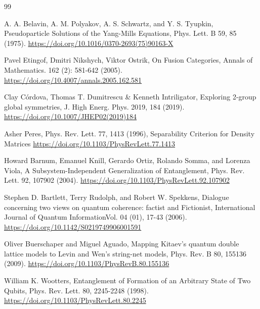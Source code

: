 \documentclass[12pt,a4paper]{article}
\begin{document}
\begin{thebibliography}{99}
	
	A. A. Belavin, A. M. Polyakov, A. S. Schwartz, and Y. S. Tyupkin,
	Pseudoparticle Solutions of the Yang-Mills Equations,
	Phys. Lett. B 59, 85 (1975).
	\url{https://doi.org/10.1016/0370-2693(75)90163-X}
	
	
	Pavel Etingof, Dmitri Nikshych, Viktor Ostrik,
	On Fusion Categories,
	Annals of Mathematics. 162 (2): 581-642 (2005).
	\url{https://doi.org/10.4007/annals.2005.162.581}
	
	
	Clay Córdova, Thomas T. Dumitrescu \& Kenneth Intriligator,
	Exploring 2-group global symmetries,
	J. High Energ. Phys. 2019, 184 (2019).
	\url{https://doi.org/10.1007/JHEP02(2019)184}
	
	
	
	
	Asher Peres,
	Phys. Rev. Lett. 77, 1413 (1996),
	Separability Criterion for Density Matrices
	\url{https://doi.org/10.1103/PhysRevLett.77.1413}
	
	
	
	Howard Barnum, Emanuel Knill, Gerardo Ortiz, Rolando Somma, and Lorenza Viola, 
	A Subsystem-Independent Generalization of Entanglement,  
	Phys. Rev. Lett. 92, 107902 (2004).  
	\url{https://doi.org/10.1103/PhysRevLett.92.107902}  
	
	
	Stephen D. Bartlett, Terry Rudolph, and Robert W. Spekkens,  
	Dialogue concerning two views on quantum coherence: factist and Fictionist,  
	International Journal of Quantum InformationVol. 04 (01), 17-43 (2006).
	\url{https://doi.org/10.1142/S0219749906001591}
	
	
	
	Oliver Buerschaper and Miguel Aguado,  
	Mapping Kitaev’s quantum double lattice models to Levin and Wen’s string-net models,  
	Phys. Rev. B 80, 155136 (2009).
	\url{https://doi.org/10.1103/PhysRevB.80.155136} 
	
	
	
	William K. Wootters,
	Entanglement of Formation of an Arbitrary State of Two Qubits,
	Phys. Rev. Lett. 80, 2245-2248 (1998).
	\url{https://doi.org/10.1103/PhysRevLett.80.2245}
	

\end{thebibliography}
\end{document}
